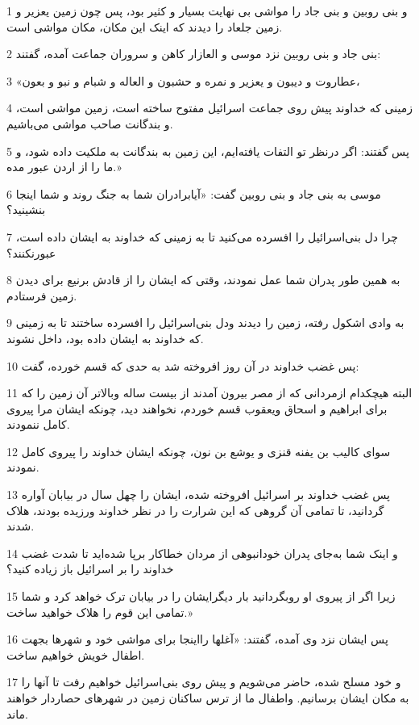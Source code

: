 \par 1 و بنی روبین و بنی جاد را مواشی بی نهایت بسیار و کثیر بود، پس چون زمین یعزیر و زمین جلعاد را دیدند که اینک این مکان، مکان مواشی است.
\par 2 بنی جاد و بنی روبین نزد موسی و العازار کاهن و سروران جماعت آمده، گفتند:
\par 3 «عطاروت و دیبون و یعزیر و نمره و حشبون و العاله و شبام و نبو و بعون،
\par 4 زمینی که خداوند پیش روی جماعت اسرائیل مفتوح ساخته است، زمین مواشی است، و بندگانت صاحب مواشی می‌باشیم.
\par 5 پس گفتند: اگر درنظر تو التفات یافته‌ایم، این زمین به بندگانت به ملکیت داده شود، و ما را از اردن عبور مده.»
\par 6 موسی به بنی جاد و بنی روبین گفت: «آیابرادران شما به جنگ روند و شما اینجا بنشینید؟
\par 7 چرا دل بنی‌اسرائیل را افسرده می‌کنید تا به زمینی که خداوند به ایشان داده است، عبورنکنند؟
\par 8 به همین طور پدران شما عمل نمودند، وقتی که ایشان را از قادش برنیع برای دیدن زمین فرستادم.
\par 9 به وادی اشکول رفته، زمین را دیدند ودل بنی‌اسرائیل را افسرده ساختند تا به زمینی که خداوند به ایشان داده بود، داخل نشوند.
\par 10 پس غضب خداوند در آن روز افروخته شد به حدی که قسم خورده، گفت:
\par 11 البته هیچکدام ازمردانی که از مصر بیرون آمدند از بیست ساله وبالاتر آن زمین را که برای ابراهیم و اسحاق ویعقوب قسم خوردم، نخواهند دید، چونکه ایشان مرا پیروی کامل ننمودند.
\par 12 سوای کالیب بن یفنه قنزی و یوشع بن نون، چونکه ایشان خداوند را پیروی کامل نمودند.
\par 13 پس غضب خداوند بر اسرائیل افروخته شده، ایشان را چهل سال در بیابان آواره گردانید، تا تمامی آن گروهی که این شرارت را در نظر خداوند ورزیده بودند، هلاک شدند.
\par 14 و اینک شما به‌جای پدران خودانبوهی از مردان خطاکار برپا شده‌اید تا شدت غضب خداوند را بر اسرائیل باز زیاده کنید؟
\par 15 زیرا اگر از پیروی او روبگردانید بار دیگرایشان را در بیابان ترک خواهد کرد و شما تمامی این قوم را هلاک خواهید ساخت.»
\par 16 پس ایشان نزد وی آمده، گفتند: «آغلها رااینجا برای مواشی خود و شهرها بجهت اطفال خویش خواهیم ساخت.
\par 17 و خود مسلح شده، حاضر می‌شویم و پیش روی بنی‌اسرائیل خواهیم رفت تا آنها را به مکان ایشان برسانیم. واطفال ما از ترس ساکنان زمین در شهرهای حصاردار خواهند ماند.
